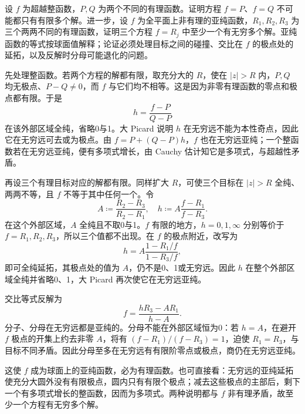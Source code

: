 \begin{exercise}[随自变量变化的有理目标]\label{b3:ex:14-7}
设 \(f\) 为超越整函数，\(P,Q\) 为两个不同的有理函数。证明方程 \(f=P\)、\(f=Q\) 不可能都只有有限多个解。进一步，设 \(f\) 为全平面上非有理的亚纯函数，\(R_1,R_2,R_3\) 为三个两两不同的有理函数，证明三个方程 \(f=R_j\) 中至少一个有无穷多个解。亚纯函数的等式按球面值解释；论证必须处理目标之间的碰撞、交比在 \(f\) 的极点处的延拓，以及反解时分母可能退化的问题。
\end{exercise}
\begin{solution}
先处理整函数。若两个方程的解都有限，取充分大的 \(R\)，使在 \(|z|>R\) 内，\(P,Q\) 均无极点、\(P-Q\ne0\)，而 \(f\) 与它们均不相等。这是因为非零有理函数的零点和极点都有限。于是
\[
 h=\frac{f-P}{Q-P}
\]
在该外部区域全纯，省略0与1。大 Picard 说明 \(h\) 在无穷远不能为本性奇点，因此它在无穷远可去或为极点。由 \(f=P+(Q-P)h\)，\(f\) 也在无穷远亚纯；一个整函数若在无穷远亚纯，便有多项式增长，由 Cauchy 估计知它是多项式，与超越性矛盾。

再设三个有理目标对应的解都有限。同样扩大 \(R\)，可使三个目标在 \(|z|>R\) 全纯、两两不等，且 \(f\) 不等于其中任何一个。令
\[
 A\coloneqq\frac{R_2-R_3}{R_2-R_1},\quad
 h\coloneqq A\frac{f-R_1}{f-R_3}.
\]
在这个外部区域，\(A\) 全纯且不取0与1。\(f\) 有限的地方，\(h=0,1,\infty\) 分别等价于 \(f=R_1,R_2,R_3\)，所以三个值都不出现。在 \(f\) 的极点附近，改写为
\[
 h=A\frac{1-R_1/f}{1-R_3/f},
\]
即可全纯延拓，其极点处的值为 \(A\)，仍不是0、1或无穷远。因此 \(h\) 在整个外部区域全纯并省略0、1，大 Picard 再次使它在无穷远亚纯。

交比等式反解为
\[
 f=\frac{hR_3-AR_1}{h-A}.
\]
分子、分母在无穷远都是亚纯的。分母不能在外部区域恒为0：若 \(h=A\)，在避开 \(f\) 极点的开集上约去非零 \(A\)，将有 \((f-R_1)/(f-R_3)=1\)，迫使 \(R_1=R_3\)，与目标不同矛盾。因此分母至多在无穷远有有限阶零点或极点，商仍在无穷远亚纯。

这使 \(f\) 成为球面上的亚纯函数，必为有理函数。也可直接看：无穷远的亚纯延拓使充分大圆外没有有限极点，圆内只有有限个极点；减去这些极点的主部后，剩下一个有多项式增长的整函数，因而为多项式。两种说明都与 \(f\) 非有理矛盾，故至少一个方程有无穷多个解。
\end{solution}

